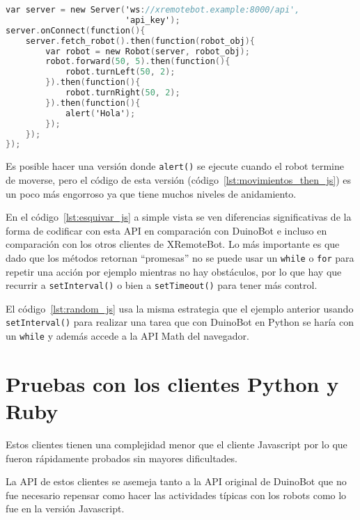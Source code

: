 \begin{lstlisting}[language=C,
caption={Secuencia de movimientos},
label=lst:movimientos_then_js]
var server = new Server('ws://xremotebot.example:8000/api',
                        'api_key');
server.onConnect(function(){
	server.fetch_robot().then(function(robot_obj){
		var robot = new Robot(server, robot_obj);
        robot.forward(50, 5).then(function(){
            robot.turnLeft(50, 2);
        }).then(function(){
            robot.turnRight(50, 2);
        }).then(function(){
            alert('Hola');
        });
	});
});
\end{lstlisting}

Es posible hacer una versión donde \texttt{alert()} se ejecute cuando
el robot termine de moverse, pero el código de esta versión
(código~\ref{lst:movimientos_then_js}) es
un poco más engorroso ya que tiene muchos niveles de anidamiento.

En el código~\ref{lst:esquivar_js} a simple vista se ven diferencias
significativas de la forma de codificar con esta API en comparación
con DuinoBot e incluso en comparación con los otros clientes de
XRemoteBot. Lo más importante es que dado que los métodos retornan
``promesas'' no se puede usar un \texttt{while} o \texttt{for} para
repetir una acción por ejemplo mientras no hay obstáculos, por lo que
hay que recurrir a \texttt{setInterval()} o bien a \texttt{setTimeout()}
para tener más control.

El código~\ref{lst:random_js} usa la misma estrategia que el ejemplo
anterior usando \texttt{setInterval()} para realizar una tarea
que con DuinoBot en Python se haría con un \texttt{while} y además
accede a la API Math del navegador.

\section{Pruebas con los clientes Python y Ruby}
Estos clientes tienen una complejidad menor que el cliente Javascript
por lo que fueron rápidamente probados sin mayores dificultades.

La API de estos clientes se asemeja tanto a la API original de
DuinoBot que no fue necesario repensar como hacer las actividades
típicas con los robots como lo fue en la versión Javascript.
